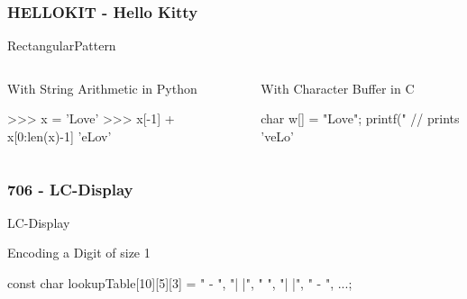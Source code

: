 \documentclass{beamer}
\begin{document}
\begin{frame}[fragile]
  \frametitle{HELLOKIT - Hello Kitty}

  \begin{algorithm}[H]
    \caption{RectangularPattern}
  \end{algorithm}

  \begin{columns}[t]
    \begin{column}{0.49\textwidth}
      \begin{block}{With String Arithmetic in Python}
        \begin{Python}
>>> x = 'Love'
>>> x[-1] + x[0:len(x)-1]
'eLov'
\end{Python}
\end{block}
    \end{column}
    
    \begin{column}{0.49\textwidth}
      \begin{block}{With Character Buffer in C}
        \begin{C}
char w[] = "Love";
printf("%
// prints 'veLo'
        \end{C}
      \end{block}
    \end{column}
  \end{columns}
\end{frame}


\begin{frame}[fragile]
  \frametitle{706 - LC-Display}
  
    \begin{algorithm}[H]
      \caption{LC-Display}
  \end{algorithm}

  \begin{block}{Encoding a Digit of size 1 }
    \begin{C}
const char lookupTable[10][5][3] = {
  { " - ",
    "| |",
    "   ",
    "| |",
    " - "},
    ...};
\end{C}
  \end{block}
\end{frame}
\end{document}
